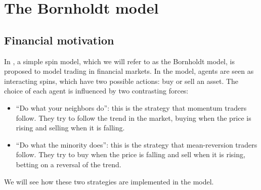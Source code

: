 \section{The Bornholdt model}
\subsection{Financial motivation}
In \cite{bornholdt}, a simple spin model, which we will refer to as the Bornholdt model, is proposed to model trading in financial markets. In the model, agents are seen as interacting spins, which have two possible actions: buy or sell an asset. The choice of each agent is influenced by two contrasting forces:
\begin{itemize}
    \item ``Do what your neighbors do'': this is the strategy that momentum traders follow. They try to follow the trend in the market, buying when the price is rising and selling when it is falling.
    \item ``Do what the minority does'': this is the strategy that mean-reversion traders follow. They try to buy when the price is falling and sell when it is rising, betting on a reversal of the trend.
\end{itemize}
We will see how these two strategies are implemented in the model.

